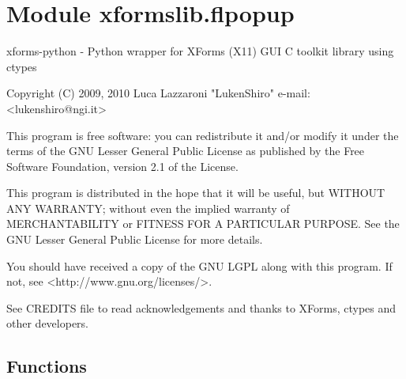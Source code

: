 %
%
%


\section{Module xformslib.flpopup}

    \label{xformslib:flpopup}
xforms-python - Python wrapper for XForms (X11) GUI C toolkit library using
ctypes

Copyright (C) 2009, 2010  Luca Lazzaroni "LukenShiro" e-mail: 
{\textless}lukenshiro@ngi.it{\textgreater}

This program is free software: you can redistribute it and/or modify it 
under the terms of the GNU Lesser General Public License as published by 
the Free Software Foundation, version 2.1 of the License.

This program is distributed in the hope that it will be useful, but WITHOUT
ANY WARRANTY; without even the implied warranty of MERCHANTABILITY or 
FITNESS FOR A PARTICULAR PURPOSE. See the GNU Lesser General Public License
for more details.

You should have received a copy of the GNU LGPL along with this program. If
not, see {\textless}http://www.gnu.org/licenses/{\textgreater}.

See CREDITS file to read acknowledgements and thanks to XForms, ctypes and 
other developers.



  \subsection{Functions}

    \label{xformslib:flpopup:fl_popup_add}

